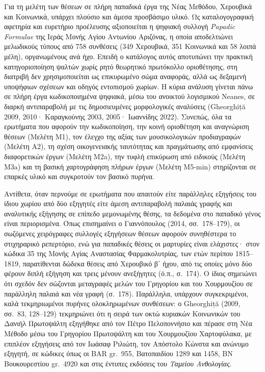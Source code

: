 \documentclass[11pt,a4paper]{article}
\begin{document}
Για τη μελέτη των θέσεων σε πλήρη παπαδικά έργα της Νέας Μεθόδου, Χερουβικά και Κοινωνικά, υπάρχει πλούσιο και άμεσα προσβάσιμο υλικό. Ως καταλογογραφική αφετηρία και ευρετήριο προέλευσης αξιοποιείται η ψηφιακή συλλογή \emph{Papadic Formulae} της Ιεράς Μονής Αγίου Αντωνίου Αριζόνας, η οποία αποδελτιώνει μελωδικούς τύπους από 758 συνθέσεις (349 Χερουβικά, 351 Κοινωνικά και 58 λοιπά μέλη), οργανωμένους ανά ήχο. Επειδή ο κατάλογος αυτός αποτυπώνει την πρακτική κατηγοριοποίηση ψαλτών χωρίς ρητό θεωρητικό πρωτόκολλο οριοθέτησης, στη διατριβή δεν χρησιμοποιείται ως επικυρωμένο σώμα αναφοράς, αλλά ως δεξαμενή υποψήφιων σχέσεων και οδηγός εντοπισμού χωρίων. Η κύρια ανάλυση γίνεται πάνω σε πλήρη έργα κωδικοποιημένα ψηφιακά, μέσω του ανοικτού λογισμικού Neanes, σε διαρκή αντιπαραβολή με τις δημοσιευμένες μορφολογικές αναλύσεις (Gheorghiță 2009, 2010· Καραγκούνης 2003, 2005· Ιωαννίδης 2022). Συνεπώς, όλα τα ερωτήματα που αφορούν την κωδικοποίηση, την κοινή οριοθέτηση και αναγνώριση θέσεων (Μελέτη Μ1), τον έλεγχο της αξίας των μουσικολογικών προδιαγραφών (Μελέτη Α2), τη σχέση οικογενειακής ταυτότητας και πραγμάτωσης από εμφανίσεις διαφορετικών έργων (Μελέτη Μ2a), την τυφλή επικύρωση από ειδικούς (Μελέτη Μ3a) και τη βασική χαρτογράφηση πλήρων έργων (Μελέτη Μ5-min) στηρίζονται σε επαρκές υλικό και συγκροτούν τον βασικό πυρήνα.

Αντίθετα, όταν περνούμε σε ερωτήματα που απαιτούν είτε παράλληλες εξηγήσεις του ίδιου χωρίου από δύο εξηγητές είτε άμεση αντιπαραβολή παλαιάς γραφής και αναλυτικής εξήγησης σε επίπεδο μεμονωμένης θέσης, τα δεδομένα στο παπαδικό γένος είναι περιορισμένα. Όπως επισημαίνει ο Γιαννόπουλος (2014, σσ.~178--179), οι σωζόμενες χειρόγραφες συλλογές εξηγήσεων θέσεων αφορούν συνηθέστερα το στιχηραρικό ρεπερτόριο, ενώ για παπαδικές θέσεις οι μαρτυρίες είναι ελάχιστες· στον κώδικα 35 της Μονής Αγίας Αναστασίας Φαρμακολυτρίας, των ετών περίπου 1815--1819, παρατίθενται δώδεκα θέσεις από Χερουβικό β΄ ήχου, από τις οποίες μόνο δύο φέρουν διπλή εξήγηση και τρεις μένουν ανεξήγητες (ό.π., σ.~174). Ο ίδιος σημειώνει ότι σχεδόν δεν σώζονται μεταγραφές μελών του Γρηγορίου και του Χουρμουζίου σε παράλληλη παλαιά και νέα γραφή (σ.~178). Παράλληλα, υπάρχουν συγκεκριμένοι, καλά τεκμηριωμένοι πυρήνες ολοκληρωμένων συνθέσεων: ο Gheorghiță (2009, σσ.~83, 128--129) τεκμηριώνει ότι η σειρά των οκτώ κυριακών Κοινωνικών του Δανιήλ Πρωτοψάλτη εξηγήθηκε από τον Πέτρο Πελοποννήσιο και πέρασε στη Νέα Μέθοδο μέσω του Γρηγορίου Πρωτοψάλτη και του Χουρμουζίου Χαρτοφύλακα, με επιπλέον εξηγήσεις από τον Ιωάσαφ Ριλιώτη, τον Απόστολο Κώνστα και ανώνυμο εξηγητή, σε κώδικες όπως οι BAR gr.~955, Βατοπαιδίου 1289 και 1458, BN Βουκουρεστίου gr.~4920 και στις έντυπες εκδόσεις του \emph{Ταμείου Ανθολογίας}.
\end{document}
